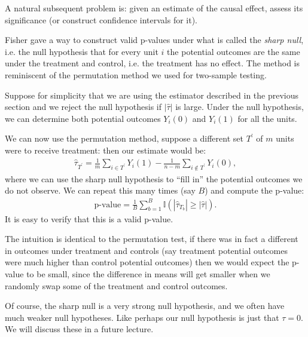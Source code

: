 \documentclass[twoside,12pt]{article}
\begin{document}
A natural subsequent problem is: given an estimate of the causal effect, assess its significance (or  construct confidence intervals for it).

Fisher gave a way to construct valid p-values under what is called the \emph{sharp null}, i.e. the null hypothesis that for every unit $i$ the potential outcomes are the same under the treatment and control, i.e. the treatment has no effect.  The method is reminiscent of the permutation method we used for two-sample testing.

Suppose for simplicity that we are using the estimator described in the previous section and we reject the null hypothesis if $|\widehat{\tau}|$ is large.
Under the null hypothesis, we can determine both potential outcomes $Y_i(0)$ and $Y_i(1)$ for all the units. 

We can now use the permutation method, suppose a different set $T^\prime$ of $m$ units were to receive treatment: then our estimate would be:
\begin{align*}
\widehat{\tau}_{T^\prime} = \frac{1}{m} \sum_{i \in T^\prime} Y_i(1) - \frac{1}{n - m} \sum_{i \notin T^\prime} Y_i(0),
\end{align*}
where we can use the sharp null hypothesis to ``fill in'' the potential outcomes we do not observe. We can repeat this many times (say $B$) and compute the p-value:
\begin{align*}
\text{p-value} = \frac{1}{B} \sum_{b = 1}^B \mathbb{I} (|\widehat{\tau}_{T_b}| \geq |\widehat{\tau}|).
\end{align*}
It is easy to verify that this is a valid p-value.

The intuition is identical to the permutation test, if there was in fact a different in outcomes under treatment and controls (say treatment potential outcomes were much higher than control potential outcomes) then we would expect the p-value to be small, since the difference in means will get smaller when we randomly swap some of the treatment and control outcomes. 

Of course, the sharp null is a very strong null hypothesis, and we often have much weaker null hypotheses. Like perhaps our null hypothesis is just that $\tau = 0$. We will discuss these in a future lecture. 
\end{document}
